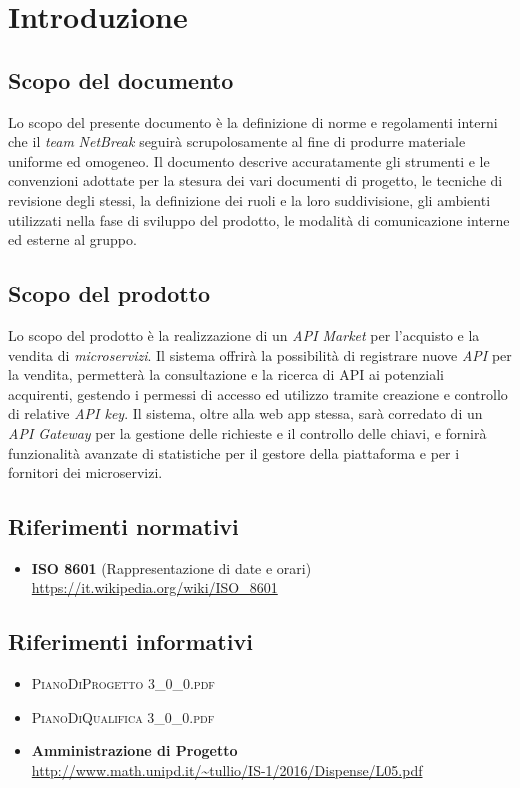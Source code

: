 \newpage
\section{Introduzione}

\subsection{Scopo del documento}
Lo scopo del presente documento è la definizione di norme e regolamenti interni che il \textit{team} \textit{NetBreak} seguirà scrupolosamente al fine di produrre materiale uniforme ed omogeneo. Il documento descrive accuratamente gli strumenti e le convenzioni adottate per la stesura dei vari documenti di progetto, le tecniche di revisione degli stessi, la definizione dei ruoli e la loro suddivisione, gli ambienti utilizzati nella fase di sviluppo del prodotto, le modalità di comunicazione interne ed esterne al gruppo.

\subsection{Scopo del prodotto}
Lo scopo del prodotto è la realizzazione di un \textit{API Market} per l'acquisto e la vendita di \textit{microservizi}. Il sistema offrirà la possibilità di registrare nuove \textit{API} per la vendita, permetterà la consultazione e la ricerca di API ai potenziali acquirenti, gestendo i permessi di accesso ed utilizzo tramite creazione e controllo di relative \textit{API key}. Il sistema, oltre alla web app stessa, sarà corredato di un \textit{API Gateway} per la gestione delle richieste e il controllo delle chiavi, e fornirà funzionalità avanzate di statistiche per il gestore della piattaforma e per i fornitori dei microservizi.

\subsection{Riferimenti normativi}
\begin{itemize}
	\item \textbf{ISO 8601} (Rappresentazione di date e orari)\\
	\url{https://it.wikipedia.org/wiki/ISO\_8601}
\end{itemize}

\subsection{Riferimenti informativi}
\begin{itemize}
	\item \textsc{PianoDiProgetto 3\_0\_0.pdf}
	\item \textsc{PianoDiQualifica 3\_0\_0.pdf}
	\item \textbf{Amministrazione di Progetto}\\
	\url{http://www.math.unipd.it/~tullio/IS-1/2016/Dispense/L05.pdf}
\end{itemize}

